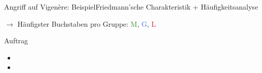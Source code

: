 \begin{frame}{Angriff auf Vigenère: Beispiel}{Friedmann'sche Charakteristik + Häufigkeitsanalyse}
\texttt{}
		
		$\rightarrow$ Häufigster Buchstaben pro Gruppe: \textcolor{ForestGreen}{M}, \textcolor{RoyalBlue}{G}, \textcolor{Crimson}{L}
		
		\begin{figure}[H]
			\centering
			\resizebox{.75\textwidth}{!}{\caesar[8] \caesar[2] \caesar[7]}
		\end{figure}
\end{frame}

\begin{frame}{Auftrag}
	\begin{itemize}
		\item {}
		\item {}
	\end{itemize}
\end{frame}